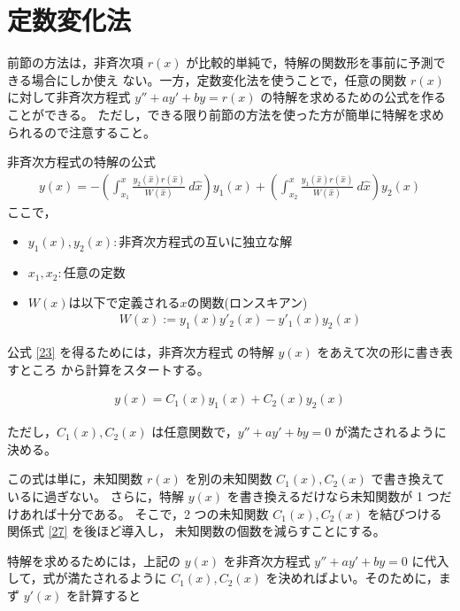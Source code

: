 \newpage
\section{定数変化法}
前節の方法は，非斉次項 $r(x)$ が比較的単純で，特解の関数形を事前に予測できる場合にしか使え
ない。一方，定数変化法を使うことで，任意の関数 $r(x)$ に対して非斉次方程式 
$y'' + ay' + by = r(x)$ の特解を求めるための公式を作ることができる。
ただし，できる限り前節の方法を使った方が簡単に特解を求められるので注意すること。

\begin{itembox}[l]{非斉次方程式の特解の公式}
  \begin{gather}
    y(x) 
    = -\left( \int_{x_1}^{x}\frac{y_2(\hat{x})r(\hat{x})}{W(\hat{x})}\:d\hat{x} \right) y_1(x)
    + \left(\int_{x_2}^{x}\frac{y_1(\hat{x})r(\hat{x})}{W(\hat{x})}\:d\hat{x}\right)y_2(x) \label{23}
  \end{gather}
  ここで，
  
  \begin{itemize}
    \item $y_1(x),y_2(x)\colon$非斉次方程式の互いに独立な解 
    \item $x_1,x_2\colon$任意の定数
    \item $W(x)$は以下で定義される$x$の関数(ロンスキアン)
    \begin{gather}
      W(x) := y_1(x)y'_2(x) - y'_1(x)y_2(x) \label{24}
    \end{gather}
  \end{itemize}
\end{itembox}


公式 \eqref{23} を得るためには，非斉次方程式 の特解
 $y(x)$ をあえて次の形に書き表すところ
から計算をスタートする。

\begin{gather}
  y(x) = C_1(x)y_1(x) + C_2(x)y_2(x) \label{25}
\end{gather}

ただし，$C_1(x), C_2(x)$ は任意関数で，$y'' + ay' + by=0$ が満たされるように決める。

この式は単に，未知関数 $r(x)$ を別の未知関数 $C_1(x), C_2(x)$ で書き換えているに過ぎない。
さらに，特解 $y(x)$ を書き換えるだけなら未知関数が 1 つだけあれば十分である。
そこで，2 つの未知関数 $C_1(x), C_2(x)$ を結びつける関係式 \eqref{27} を後ほど導入し，
未知関数の個数を減らすことにする。

特解を求めるためには，上記の $y(x)$ を非斉次方程式 $y'' + ay' + by=0$ に代入して，式が満たされるように
$C_1(x), C_2(x)$ を決めればよい。そのために，まず $y'(x)$ を計算すると

